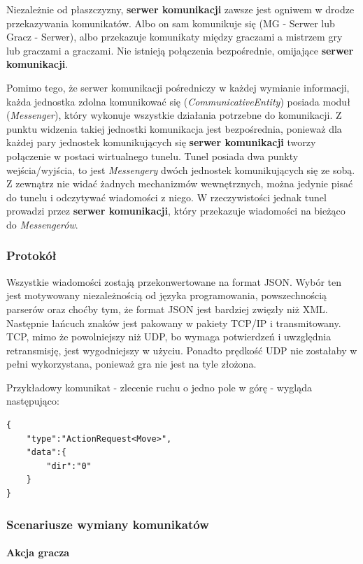 \documentclass[11pt]{article}
\let\Oldsubsubsection\subsubsection
\renewcommand{\subsubsection}{\FloatBarrier\Oldsubsubsection}
\begin{document}
\par
Niezależnie od płaszczyzny, \textbf{serwer komunikacji} zawsze jest ogniwem w drodze przekazywania komunikatów. Albo on sam komunikuje się (MG - Serwer lub Gracz - Serwer), albo przekazuje komunikaty między graczami a mistrzem gry lub graczami a graczami. Nie istnieją połączenia bezpośrednie, omijające \textbf{serwer komunikacji}.
\par
Pomimo tego, że serwer komunikacji pośredniczy w każdej wymianie informacji, każda jednostka zdolna komunikować się (\textit{CommunicativeEntity}) posiada moduł (\textit{Messenger}), który wykonuje wszystkie działania potrzebne do komunikacji. Z punktu widzenia takiej jednostki komunikacja jest bezpośrednia, ponieważ dla każdej pary jednostek komunikujących się \textbf{serwer komunikacji} tworzy połączenie w postaci wirtualnego tunelu. Tunel posiada dwa punkty wejścia/wyjścia, to jest \textit{Messengery} dwóch jednostek komunikujących się ze sobą. Z zewnątrz nie widać żadnych mechanizmów wewnętrznych, można jedynie pisać do tunelu i odczytywać wiadomości z niego. W rzeczywistości jednak tunel prowadzi przez \textbf{serwer komunikacji}, który przekazuje wiadomości na bieżąco do \textit{Messengerów}.

\subsubsection{Protokół}
\par
Wszystkie wiadomości zostają przekonwertowane na format JSON. Wybór ten jest motywowany niezależnością od języka programowania, powszechnością parserów oraz choćby tym, że format JSON jest bardziej zwięzły niż XML. Następnie łańcuch znaków jest pakowany w pakiety TCP/IP i transmitowany. TCP, mimo że powolniejszy niż UDP, bo wymaga potwierdzeń i uwzględnia retransmisję, jest wygodniejszy w użyciu. Ponadto prędkość UDP nie zostałaby w pełni wykorzystana, ponieważ gra nie jest na tyle złożona.
\par
Przykładowy komunikat - zlecenie ruchu o jedno pole w górę - wygląda następująco:
\begin{lstlisting}
{ 
	"type":"ActionRequest<Move>",
	"data":{
		"dir":"0"
	}
}
\end{lstlisting}

\subsubsection{Scenariusze wymiany komunikatów}

\paragraph{Akcja gracza}
\end{document}
